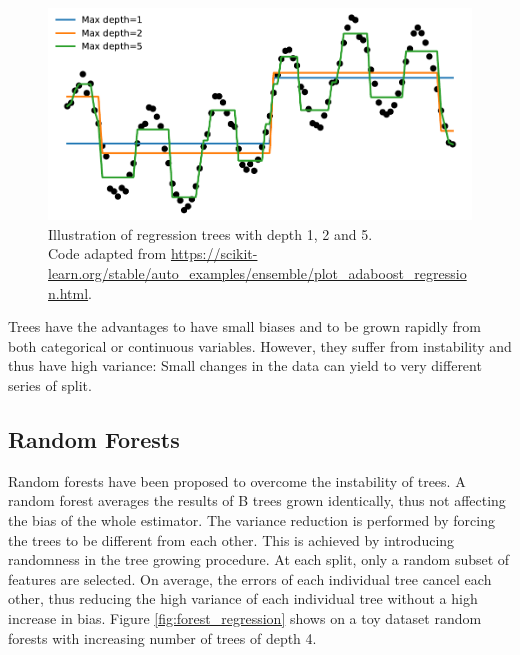 \documentclass[french,12pt,twoside,a4paper]{book}
\begin{document}
\begin{appendices}
  \begin{figure}[!b]
    \centering
    \includegraphics[width=0.8\linewidth]{img/chapter_1/tree_3.pdf}
    \caption{Illustration of regression trees with depth 1, 2 and 5.\\Code
      adapted from
      \url{https://scikit-learn.org/stable/auto_examples/ensemble/plot_adaboost_regression.html}.}%
    \label{fig:tree_regression}
  \end{figure}

  Trees have the advantages to have small biases and to be grown rapidly from
  both categorical or continuous variables. However, they suffer from
  instability and thus have high variance: Small changes in the data can yield
  to very different series of split.

  \subsection{Random Forests}\label{apd:intro:random_forests}

  Random forests \citep{breiman2001random} have been proposed to overcome the
  instability of trees. A random forest averages the results of B trees grown
  identically, thus not affecting the bias of the whole estimator. The variance
  reduction is performed by forcing the trees to be different from each other.
  This is achieved by introducing randomness in the tree growing procedure. At
  each split, only a random subset of features are selected. On average, the
  errors of each individual tree cancel each other, thus reducing the high
  variance of each individual tree without a high increase in bias. Figure
  \ref{fig:forest_regression} shows on a toy dataset random forests with
  increasing number of trees of depth 4.


\end{appendices}
\end{document}
